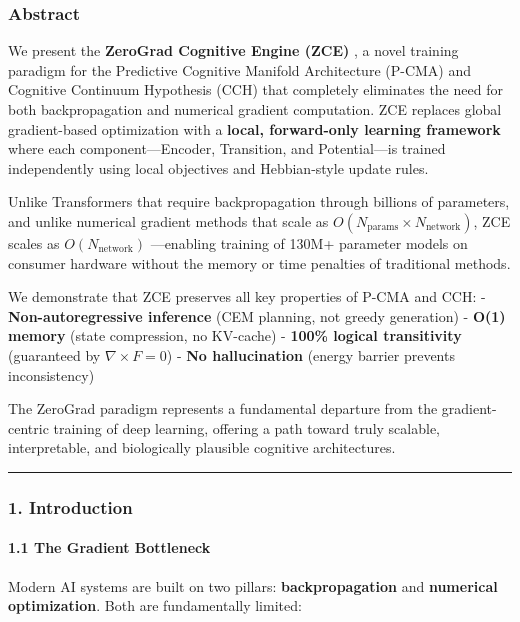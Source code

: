 \documentclass[
  11pt,
  a4paper,
]{article}
\begin{document}
\subsubsection{Abstract}\label{abstract-8}

We present the \textbf{ZeroGrad Cognitive Engine (ZCE)} , a novel
training paradigm for the Predictive Cognitive Manifold Architecture
(P-CMA) and Cognitive Continuum Hypothesis (CCH) that completely
eliminates the need for both backpropagation and numerical gradient
computation. ZCE replaces global gradient-based optimization with a
\textbf{local, forward-only learning framework} where each
component---Encoder, Transition, and Potential---is trained
independently using local objectives and Hebbian-style update rules.

Unlike Transformers that require backpropagation through billions of
parameters, and unlike numerical gradient methods that scale as
\(O(N_{\text{params}} \times N_{\text{network}})\), ZCE scales as
\textbf{\(O(N_{\text{network}})\)} ---enabling training of 130M+
parameter models on consumer hardware without the memory or time
penalties of traditional methods.

We demonstrate that ZCE preserves all key properties of P-CMA and CCH: -
\textbf{Non-autoregressive inference} (CEM planning, not greedy
generation) - \textbf{O(1) memory} (state compression, no KV-cache) -
\textbf{100\% logical transitivity} (guaranteed by
\(\nabla \times F = 0\)) - \textbf{No hallucination} (energy barrier
prevents inconsistency)

The ZeroGrad paradigm represents a fundamental departure from the
gradient-centric training of deep learning, offering a path toward truly
scalable, interpretable, and biologically plausible cognitive
architectures.

\begin{center}\rule{0.5\linewidth}{0.5pt}\end{center}

\subsubsection{1. Introduction}\label{introduction-8}

\paragraph{1.1 The Gradient Bottleneck}\label{the-gradient-bottleneck}

Modern AI systems are built on two pillars: \textbf{backpropagation} and
\textbf{numerical optimization}. Both are fundamentally limited:
\end{document}
